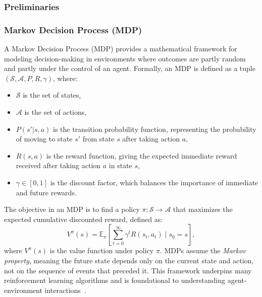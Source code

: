 \subsubsection{Preliminaries}\label{prelims}

\subsubsection{Markov Decision Process (MDP)}

A Markov Decision Process (MDP) provides a mathematical framework for modeling decision-making in environments where outcomes are partly random and partly under the control of an agent. Formally, an MDP is defined as a tuple $(\mathcal{S}, \mathcal{A}, P, R, \gamma)$, where:
\begin{itemize}
    \item $\mathcal{S}$ is the set of states,
    \item $\mathcal{A}$ is the set of actions,
    \item $P(s'|s,a)$ is the transition probability function, representing the probability of moving to state $s'$ from state $s$ after taking action $a$,
    \item $R(s,a)$ is the reward function, giving the expected immediate reward received after taking action $a$ in state $s$,
    \item $\gamma \in [0,1]$ is the discount factor, which balances the importance of immediate and future rewards.
\end{itemize}

The objective in an MDP is to find a policy $\pi: \mathcal{S} \rightarrow \mathcal{A}$ that maximizes the expected cumulative discounted reward, defined as:
\[
V^\pi(s) = \mathbb{E}_\pi \left[ \sum_{t=0}^{\infty} \gamma^t R(s_t, a_t) \mid s_0 = s \right],
\]
where $V^\pi(s)$ is the value function under policy $\pi$. MDPs assume the \textit{Markov property}, meaning the future state depends only on the current state and action, not on the sequence of events that preceded it. This framework underpins many reinforcement learning algorithms and is foundational to understanding agent-environment interactions~\cite{puterman1994markov}.

